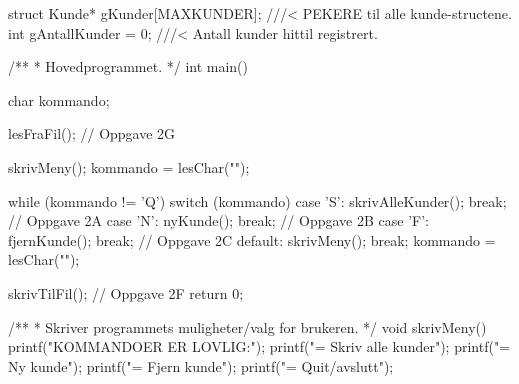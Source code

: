 \begin{kode}
struct Kunde* gKunder[MAXKUNDER];   ///<  PEKERE til alle kunde-structene.
int gAntallKunder = 0;              ///<  Antall kunder hittil registrert.

/**
 *  Hovedprogrammet.
 */
int main()  {
  char kommando;

  lesFraFil();                               //  Oppgave 2G

  skrivMeny();
  kommando = lesChar("\nValg");

  while (kommando != 'Q')  {
    switch (kommando)  {
      case 'S':  skrivAlleKunder();  break;  //  Oppgave 2A
      case 'N':  nyKunde();          break;  //  Oppgave 2B
      case 'F':  fjernKunde();       break;  //  Oppgave 2C
      default:   skrivMeny();        break;
    }
    kommando = lesChar("\nValg");
  }

  skrivTilFil();                             //  Oppgave 2F
  return 0;
}

/**
 *  Skriver programmets muligheter/valg for brukeren.
 */
void skrivMeny()  {
  printf("\nFOLGENDE KOMMANDOER ER LOVLIG:\n");
  printf("\tS = Skriv alle kunder\n");
  printf("\tN = Ny kunde\n");
  printf("\tF = Fjern kunde\n");
  printf("\tQ = Quit/avslutt\n");
}
\end{kode}

